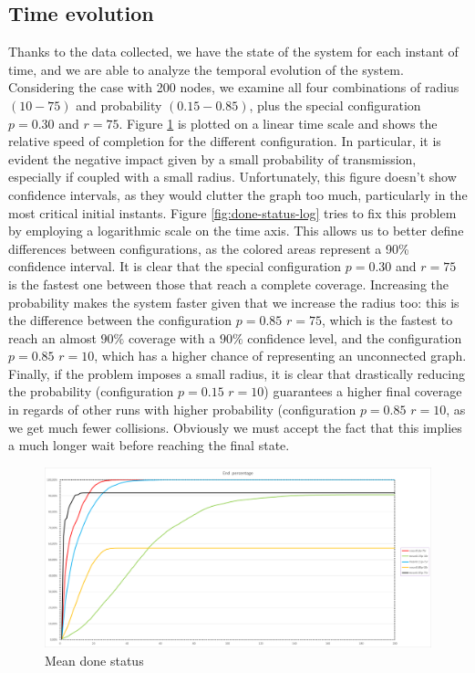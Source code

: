 \subsection{Time evolution}\label{time-evolution}
Thanks to the data collected, we have the state of the system for each instant of time, and we are able to analyze the temporal evolution of the system. Considering the case with 200 nodes, we examine all four combinations of radius $(10-75)$ and probability $(0.15-0.85)$, plus the special configuration $p=0.30$ and $r=75$. 
Figure \ref{fig:done-status} is plotted on a linear time scale and shows the relative speed of completion for the different configuration. In particular, it is evident the negative impact given by a small probability of transmission, especially if coupled with a small radius. 
Unfortunately, this figure doesn't show confidence intervals, as they would clutter the graph too much, particularly in the most critical initial instants. 
Figure \ref{fig:done-status-log} tries to fix this problem by employing a logarithmic scale on the time axis. This allows us to better define differences between configurations, as the colored areas represent a 90\% confidence interval. It is clear that the special configuration $p=0.30$ and $r=75$ is the fastest one between those that reach a complete coverage. 
Increasing the probability makes the system faster given that we increase the radius too: this is the difference between the configuration $p=0.85$ $r=75$, which is the fastest to reach an almost $90\%$ coverage with a $90\%$ confidence level, and the configuration $p=0.85$ $r=10$, which has a higher chance of representing an unconnected graph. 
Finally, if the problem imposes a small radius, it is clear that drastically reducing the probability (configuration $p=0.15$ $r=10$) guarantees a higher final coverage in regards of other runs with higher probability (configuration $p=0.85$ $r=10$, as we get much fewer collisions. Obviously we must accept the fact that this implies a much longer wait before reaching the final state.
\begin{figure}[H]
\centering
    \includegraphics[width= 1\textwidth]{./images/temporalDone.png}
    \caption{Mean done status}
    \label{fig:done-status}
\end{figure}
